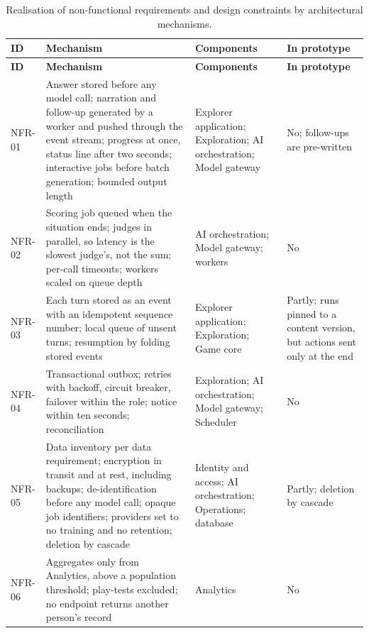 {\small
\begin{longtable}{|>{\raggedright\arraybackslash}p{}|>{\raggedright\arraybackslash}p{}|>{\raggedright\arraybackslash}p{}|>{\raggedright\arraybackslash}p{}|}
\caption{Realisation of non-functional requirements and design constraints by architectural mechanisms.} \\
\hline
\textbf{ID} & \textbf{Mechanism} & \textbf{Components} & \textbf{In prototype} \\ \hline
\endfirsthead
\hline
\textbf{ID} & \textbf{Mechanism} & \textbf{Components} & \textbf{In prototype} \\ \hline
\endhead
NFR-01 & Answer stored before any model call; narration and follow-up generated by a worker and pushed through the event stream; progress at once, status line after two seconds; interactive jobs before batch generation; bounded output length & Explorer application; Exploration; AI orchestration; Model gateway & No; follow-ups are pre-written \\ \hline
NFR-02 & Scoring job queued when the situation ends; judges in parallel, so latency is the slowest judge's, not the sum; per-call timeouts; workers scaled on queue depth & AI orchestration; Model gateway; workers & No \\ \hline
NFR-03 & Each turn stored as an event with an idempotent sequence number; local queue of unsent turns; resumption by folding stored events & Explorer application; Exploration; Game core & Partly; runs pinned to a content version, but actions sent only at the end \\ \hline
NFR-04 & Transactional outbox; retries with backoff, circuit breaker, failover within the role; notice within ten seconds; reconciliation & Exploration; AI orchestration; Model gateway; Scheduler & No \\ \hline
NFR-05 & Data inventory per data requirement; encryption in transit and at rest, including backups; de-identification before any model call; opaque job identifiers; providers set to no training and no retention; deletion by cascade & Identity and access; AI orchestration; Operations; database & Partly; deletion by cascade \\ \hline
NFR-06 & Aggregates only from Analytics, above a population threshold; play-tests excluded; no endpoint returns another person's record & Analytics & No \\ \hline

\end{longtable}}
